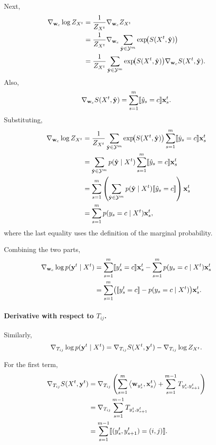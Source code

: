 \documentclass[11pt]{report}
\begin{document}
Next,
\begin{align}
{\nabla}_{\mathbf{\boldsymbol{w}}_c}\log Z_{X^t}
&=
\frac{1}{Z_{X^t}} {\nabla}_{\mathbf{\boldsymbol{w}}_c} Z_{X^t} \\
&=
\frac{1}{Z_{X^t}}
{\nabla}_{\mathbf{\boldsymbol{w}}_c}
\sum_{\hat{\mathbf{\boldsymbol{y}}}\in\mathcal{Y}^m}
\exp\!\bigl(S(X^t,\hat{\mathbf{\boldsymbol{y}}})\bigr) \\
&=
\frac{1}{Z_{X^t}}
\sum_{\hat{\mathbf{\boldsymbol{y}}}\in\mathcal{Y}^m}
\exp\!\bigl(S(X^t,\hat{\mathbf{\boldsymbol{y}}})\bigr)
{\nabla}_{\mathbf{\boldsymbol{w}}_c} S(X^t,\hat{\mathbf{\boldsymbol{y}}}).
\end{align}
Also,
\begin{align}
{\nabla}_{\mathbf{\boldsymbol{w}}_c} S(X^t,\hat{\mathbf{\boldsymbol{y}}})
=
\sum_{s=1}^m \llbracket \hat y_s = c \rrbracket \mathbf{\boldsymbol{x}}_s^t.
\end{align}
Substituting,
\begin{align}
{\nabla}_{\mathbf{\boldsymbol{w}}_c}\log Z_{X^t}
&=
\frac{1}{Z_{X^t}}
\sum_{\hat{\mathbf{\boldsymbol{y}}}\in\mathcal{Y}^m}
\exp\!\bigl(S(X^t,\hat{\mathbf{\boldsymbol{y}}})\bigr)
\sum_{s=1}^m \llbracket \hat y_s = c \rrbracket \mathbf{\boldsymbol{x}}_s^t \\
&=
\sum_{\hat{\mathbf{\boldsymbol{y}}}\in\mathcal{Y}^m}
p(\hat{\mathbf{\boldsymbol{y}}}\mid X^t)
\sum_{s=1}^m \llbracket \hat y_s = c \rrbracket \mathbf{\boldsymbol{x}}_s^t \\
&=
\sum_{s=1}^m
\left(
\sum_{\hat{\mathbf{\boldsymbol{y}}}\in\mathcal{Y}^m}
p(\hat{\mathbf{\boldsymbol{y}}}\mid X^t)\llbracket \hat y_s = c \rrbracket
\right)\mathbf{\boldsymbol{x}}_s^t \\
&=
\sum_{s=1}^m p(y_s = c \mid X^t)\mathbf{\boldsymbol{x}}_s^t,
\end{align}
where the last equality uses the definition of the marginal probability.

Combining the two parts,
\begin{align}
{\nabla}_{\mathbf{\boldsymbol{w}}_c}\log p(\mathbf{\boldsymbol{y}}^t \mid X^t)
&=
\sum_{s=1}^m \llbracket y_s^t = c \rrbracket \mathbf{\boldsymbol{x}}_s^t
-
\sum_{s=1}^m p(y_s = c \mid X^t)\mathbf{\boldsymbol{x}}_s^t \\
&=
\sum_{s=1}^m
\bigl(
\llbracket y_s^t = c \rrbracket - p(y_s = c \mid X^t)
\bigr)\mathbf{\boldsymbol{x}}_s^t.
\end{align}

\paragraph{Derivative with respect to $T_{ij}$.}
Similarly,
\begin{align}
{\nabla}_{T_{ij}}\log p(\mathbf{\boldsymbol{y}}^t \mid X^t)
=
{\nabla}_{T_{ij}} S(X^t,\mathbf{\boldsymbol{y}}^t)
-
{\nabla}_{T_{ij}}\log Z_{X^t}.
\end{align}

For the first term,
\begin{align}
{\nabla}_{T_{ij}} S(X^t,\mathbf{\boldsymbol{y}}^t)
&=
{\nabla}_{T_{ij}}
\left(
\sum_{s=1}^m \left\langle \mathbf{\boldsymbol{w}}_{y_s^t},\mathbf{\boldsymbol{x}}_s^t \right\rangle
+
\sum_{s=1}^{m-1} T_{y_s^t,y_{s+1}^t}
\right) \\
&=
{\nabla}_{T_{ij}}
\sum_{s=1}^{m-1} T_{y_s^t,y_{s+1}^t} \\
&=
\sum_{s=1}^{m-1}
\llbracket (y_s^t,y_{s+1}^t) = (i,j) \rrbracket.
\end{align}
\end{document}
